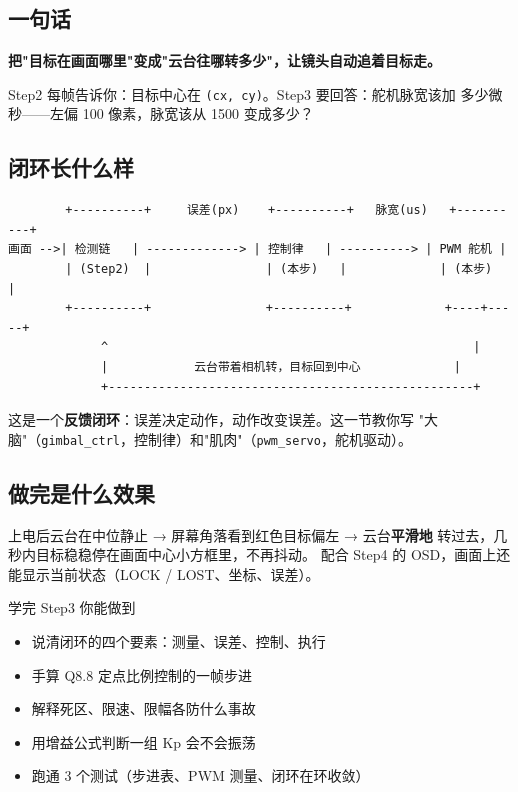 \documentclass[11pt]{ctexart}
\newcommand{\code}[1]{\texttt{#1}}
\begin{document}
\subsection{一句话}

\textbf{把"目标在画面哪里"变成"云台往哪转多少"，让镜头自动追着目标走。}

Step2 每帧告诉你：目标中心在 \code{(cx, cy)}。Step3 要回答：舵机脉宽该加
多少微秒——左偏 100 像素，脉宽该从 1500 变成多少？

\subsection{闭环长什么样}

\begin{Verbatim}
        +----------+     误差(px)    +----------+   脉宽(us)   +----------+
画面 -->| 检测链   | -------------> | 控制律   | ----------> | PWM 舵机 |
        | (Step2)  |                | (本步)   |             | (本步)   |
        +----------+                +----------+             +----+-----+
             ^                                                   |
             |            云台带着相机转，目标回到中心             |
             +---------------------------------------------------+
\end{Verbatim}

这是一个\textbf{反馈闭环}：误差决定动作，动作改变误差。这一节教你写
"大脑"（\code{gimbal\_ctrl}，控制律）和"肌肉"（\code{pwm\_servo}，舵机驱动）。

\subsection{做完是什么效果}

上电后云台在中位静止 → 屏幕角落看到红色目标偏左 → 云台\textbf{平滑地}
转过去，几秒内目标稳稳停在画面中心小方框里，不再抖动。
配合 Step4 的 OSD，画面上还能显示当前状态（LOCK / LOST、坐标、误差）。

\begin{okbox}{学完 Step3 你能做到}
\begin{itemize}
  \item 说清闭环的四个要素：测量、误差、控制、执行
  \item 手算 Q8.8 定点比例控制的一帧步进
  \item 解释死区、限速、限幅各防什么事故
  \item 用增益公式判断一组 Kp 会不会振荡
  \item 跑通 3 个测试（步进表、PWM 测量、闭环在环收敛）
\end{itemize}
\end{okbox}
\end{document}
